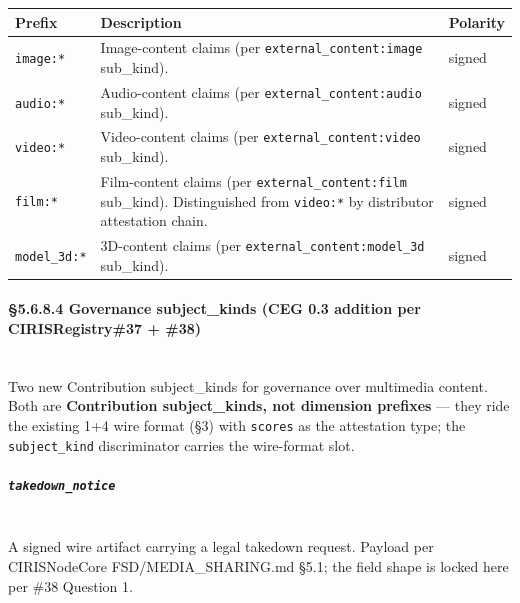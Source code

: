 \documentclass[10pt]{article}
\begin{document}
{\footnotesize
\begin{longtable}{|p{5.33cm}|p{5.33cm}|p{5.33cm}|}\hline
\textbf{Prefix} & \textbf{Description} & \textbf{Polarity} \\ \hline\endhead
\texttt{image:*} & Image-content claims (per \texttt{external\_content:image} sub\_kind). & signed \\ \hline
\texttt{audio:*} & Audio-content claims (per \texttt{external\_content:audio} sub\_kind). & signed \\ \hline
\texttt{video:*} & Video-content claims (per \texttt{external\_content:video} sub\_kind). & signed \\ \hline
\texttt{film:*} & Film-content claims (per \texttt{external\_content:film} sub\_kind). Distinguished from \texttt{video:*} by distributor attestation chain. & signed \\ \hline
\texttt{model\_3d:*} & 3D-content claims (per \texttt{external\_content:model\_3d} sub\_kind). & signed \\ \hline
\end{longtable}}


\paragraph{§5.6.8.4 Governance subject\_kinds (CEG 0.3 addition per CIRISRegistry\#37 + \#38)}\mbox{}\\


Two new Contribution subject\_kinds for governance over multimedia content. Both are \textbf{Contribution subject\_kinds, not dimension prefixes} — they ride the existing 1+4 wire format (§3) with \texttt{scores} as the attestation type; the \texttt{subject\_kind} discriminator carries the wire-format slot.


\subparagraph{\texttt{takedown\_notice}}\mbox{}\\


A signed wire artifact carrying a legal takedown request. Payload per CIRISNodeCore FSD/MEDIA\_SHARING.md §5.1; the field shape is locked here per \#38 Question 1.
\end{document}
